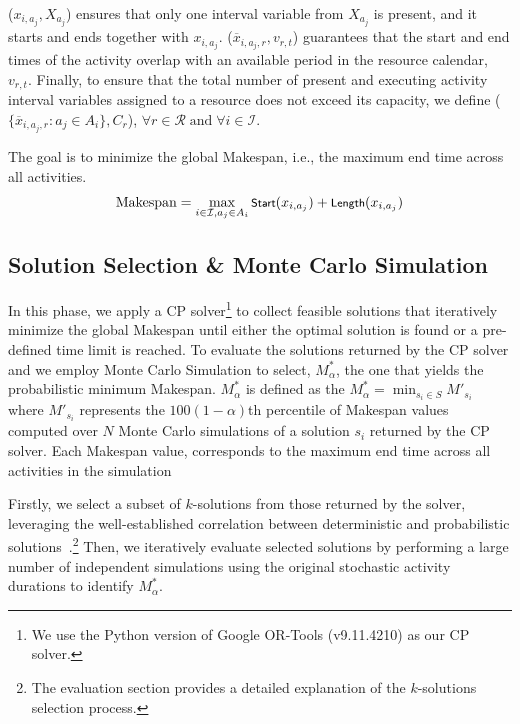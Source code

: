 (${x}_{i,a_j}, X_{a_j}$) ensures that only one interval variable from $X_{a_j}$ is present, and it starts and ends together with ${x}_{i,a_j}$. ($\overline{x}_{i,a_j,r}, v_{r,t}$) guarantees that the start and end times of the activity overlap with an available period in the resource calendar, $v_{r,t}$.
Finally, to ensure that the total number of present and executing activity interval variables assigned to a resource does not exceed its capacity, we define ($\{\overline{x}_{i,a_j,r}: a_j \in A_i \}, C_r$), $\forall r \in \mathcal{R} \; \text{and} \; \forall i \in \mathcal{I}$.

The goal is to minimize the global Makespan, i.e., the maximum end time across all activities.
\[
\text{Makespan} = \max_{i \in \mathcal{I}, a_j \in A_i} \text{\textsf{\footnotesize Start}}(x_{i,a_j}) + \textsf{\footnotesize Length}(x_{i,a_j})
\]




\subsection{Solution Selection \& Monte Carlo Simulation}

In this phase, we apply a CP solver\footnote{We use the Python version of Google OR-Tools (v9.11.4210) as our CP solver.} to
collect feasible solutions that iteratively minimize 
the global Makespan until either the optimal solution is found or a pre-defined time limit is reached. 
To evaluate the solutions returned by the CP solver and we employ Monte Carlo Simulation to select, $M_\alpha^*$, the one that yields the probabilistic minimum Makespan. 
$M_\alpha^*$ is defined as the 
$
M_\alpha^* = \min_{s_i \in S} M'_{s_i}
$
where $M'_{s_i}$ represents the $100(1 - \alpha)$th percentile of Makespan
values computed over $N$ Monte Carlo simulations of a solution $s_i$ returned by the CP solver.
Each Makespan value, corresponds to the maximum end time across all activities in the simulation

Firstly, we select a subset of $k$-solutions from those returned by the solver, leveraging the 
well-established correlation between deterministic and probabilistic solutions~\cite{BonfiettiLM14}.\footnote{The evaluation section provides a detailed explanation of the $k$-solutions selection process.} 
Then, we iteratively evaluate selected solutions by performing a large number of independent simulations using the original stochastic activity durations to identify $M^*_{\alpha}$.  

